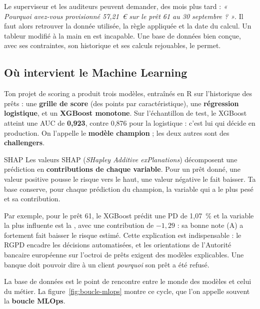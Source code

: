 \begin{observation}
Le superviseur et les auditeurs peuvent demander, des mois plus tard : \emph{« Pourquoi avez-vous
provisionné 57,21~€ sur le prêt 61 au 30 septembre ? »}. Il faut alors retrouver la donnée utilisée,
la règle appliquée et la date du calcul. Un tableur modifié à la main en est incapable. Une base de
données bien conçue, avec ses contraintes, son historique et ses calculs rejouables, le permet.
\end{observation}

\subsection{Où intervient le Machine Learning}

Ton projet de scoring a produit trois modèles, entraînés en R sur l'historique des prêts : une
\textbf{grille de score} (des points par caractéristique), une \textbf{régression logistique}, et un
\textbf{XGBoost monotone}. Sur l'échantillon de test, le XGBoost atteint une AUC de \textbf{0,923},
contre 0,876 pour la logistique : c'est lui qui décide en production. On l'appelle le
\textbf{modèle champion} ; les deux autres sont des \textbf{challengers}.

\begin{definition}{SHAP}
Les valeurs SHAP (\emph{SHapley Additive exPlanations}) décomposent une prédiction en
\textbf{contributions de chaque variable}. Pour un prêt donné, une valeur positive pousse le risque
vers le haut, une valeur négative le fait baisser. Ta base conserve, pour chaque prédiction du
champion, la variable qui a le plus pesé et sa contribution.
\end{definition}

Par exemple, pour le prêt 61, le XGBoost prédit une PD de 1,07~\% et la variable la plus influente est
la , avec une contribution de $-1{,}29$ : sa bonne note (A) a fortement fait baisser
le risque estimé. Cette explication est indispensable : le RGPD encadre les décisions automatisées, et
les orientations de l'Autorité bancaire européenne sur l'octroi de prêts exigent des modèles
explicables. Une banque doit pouvoir dire à un client \emph{pourquoi} son prêt a été refusé.

La base de données est le point de rencontre entre le monde des modèles et celui du métier. La
figure~\ref{fig:boucle-mlops} montre ce cycle, que l'on appelle souvent la \textbf{boucle MLOps}.

